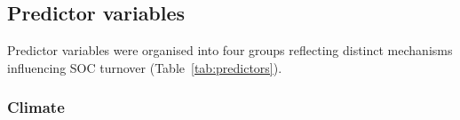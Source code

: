 \documentclass[12pt, a4paper]{article}
\begin{document}

\subsection{Predictor variables}
\label{sec:predictors}

Predictor variables were organised into four groups reflecting distinct
mechanisms influencing SOC turnover (Table~\ref{tab:predictors}).

\subsubsection{Climate}
\end{document}
